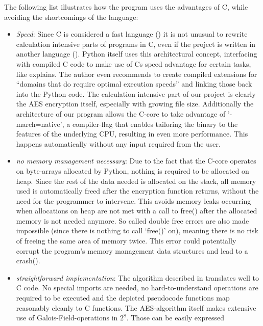 The following list illustrates how the program uses the advantages of C,
while avoiding the shortcomings of the language:

\begin{itemize}

\item
  \emph{Speed}: Since C is considered a fast language (\cite[p. 4]{cmodern}) it is
  not unusual to rewrite calculation intensive parts of programs in C,
  even if the project is written in another language
  (\cite[min. 24:33]{speedup}). Python itself
  uses this architectural concept, interfacing with compiled C code to
  make use of Cs speed advantage for certain tasks, like \cite[p. 7]{learningpython} explains. The author even recommends to create compiled extensions
  for ``domains that do require optimal execution speeds'' and linking
  those back into the Python code. The calculation intensive part of our
  project is clearly the AES encryption itself, especially with growing
  file size. Additionally the architecture of our program allows the C-core to take advantage of '-march=native',
  a compiler-flag that enables tailoring the binary to the features of the underlying CPU,
  resulting in even more performance. This happens automatically without any input required from the user.
\item
  \emph{no memory management necessary}: Due to the fact that the C-core
  operates on byte-arrays allocated by Python, nothing is required to be
  allocated on heap. Since the rest of the data needed is allocated on
  the stack, all memory used is automatically freed after the encryption
  function returns, without the need for the programmer to intervene.
  This avoids memory leaks occurring when allocations on heap are not
  met with a call to free() after the allocated memory is not needed
  anymore. So called double free errors are also made impossible (since
  there is nothing to call `free()' on), meaning there is no risk of
  freeing the same area of memory twice. This error could potentially
  corrupt the program's memory management data structures and lead to a
  crash(\cite[p. 49]{cpointers}).
\item
  \emph{straightforward implementation}: The algorithm described in
  \cite{aes2001} translates well to C code. No special imports are needed, no
  hard-to-understand operations are required to be executed and the
  depicted pseudocode functions map reasonably cleanly to C functions.
  The AES-algorithm itself makes extensive use of
  Galois-Field-operations in $2^8$. Those can be easily expressed

\end{itemize}
